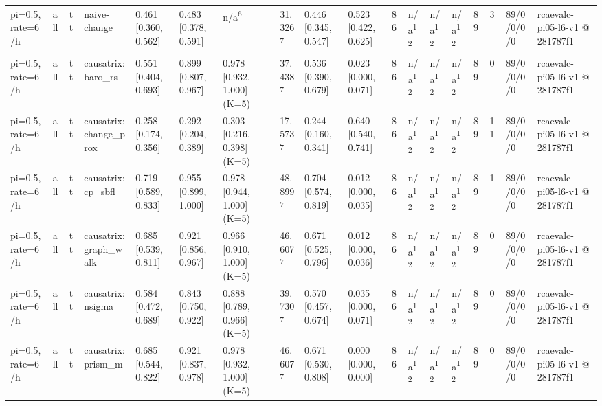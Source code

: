 \begin{table}[t]
\begin{tabular}{llllllllllllllllll}
pi=0.5, rate=6/h & all & tt & naive-change & 0.461 [0.360, 0.562] & 0.483 [0.378, 0.591] & n/a\textsuperscript{6} & 31.326\textsuperscript{7} & 0.446 [0.345, 0.547] & 0.523 [0.422, 0.625] & 86 & n/a\textsuperscript{12} & n/a\textsuperscript{12} & n/a\textsuperscript{12} & 89 & 3 & 89/0/0/0/0 & rcaevalc-pi05-l6-v1 @ 281787f1 \\
pi=0.5, rate=6/h & all & tt & causatrix:baro\_rs & 0.551 [0.404, 0.693] & 0.899 [0.807, 0.967] & 0.978 [0.932, 1.000] (K=5) & 37.438\textsuperscript{7} & 0.536 [0.390, 0.679] & 0.023 [0.000, 0.071] & 86 & n/a\textsuperscript{12} & n/a\textsuperscript{12} & n/a\textsuperscript{12} & 89 & 0 & 89/0/0/0/0 & rcaevalc-pi05-l6-v1 @ 281787f1 \\
pi=0.5, rate=6/h & all & tt & causatrix:change\_prox & 0.258 [0.174, 0.356] & 0.292 [0.204, 0.389] & 0.303 [0.216, 0.398] (K=5) & 17.573\textsuperscript{7} & 0.244 [0.160, 0.341] & 0.640 [0.540, 0.741] & 86 & n/a\textsuperscript{12} & n/a\textsuperscript{12} & n/a\textsuperscript{12} & 89 & 11 & 89/0/0/0/0 & rcaevalc-pi05-l6-v1 @ 281787f1 \\
pi=0.5, rate=6/h & all & tt & causatrix:cp\_sbfl & 0.719 [0.589, 0.833] & 0.955 [0.899, 1.000] & 0.978 [0.944, 1.000] (K=5) & 48.899\textsuperscript{7} & 0.704 [0.574, 0.819] & 0.012 [0.000, 0.035] & 86 & n/a\textsuperscript{12} & n/a\textsuperscript{12} & n/a\textsuperscript{12} & 89 & 1 & 89/0/0/0/0 & rcaevalc-pi05-l6-v1 @ 281787f1 \\
pi=0.5, rate=6/h & all & tt & causatrix:graph\_walk & 0.685 [0.539, 0.811] & 0.921 [0.856, 0.967] & 0.966 [0.910, 1.000] (K=5) & 46.607\textsuperscript{7} & 0.671 [0.525, 0.796] & 0.012 [0.000, 0.036] & 86 & n/a\textsuperscript{12} & n/a\textsuperscript{12} & n/a\textsuperscript{12} & 89 & 0 & 89/0/0/0/0 & rcaevalc-pi05-l6-v1 @ 281787f1 \\
pi=0.5, rate=6/h & all & tt & causatrix:nsigma & 0.584 [0.472, 0.689] & 0.843 [0.750, 0.922] & 0.888 [0.789, 0.966] (K=5) & 39.730\textsuperscript{7} & 0.570 [0.457, 0.674] & 0.035 [0.000, 0.071] & 86 & n/a\textsuperscript{12} & n/a\textsuperscript{12} & n/a\textsuperscript{12} & 89 & 0 & 89/0/0/0/0 & rcaevalc-pi05-l6-v1 @ 281787f1 \\
pi=0.5, rate=6/h & all & tt & causatrix:prism\_m & 0.685 [0.544, 0.822] & 0.921 [0.837, 0.978] & 0.978 [0.932, 1.000] (K=5) & 46.607\textsuperscript{7} & 0.671 [0.530, 0.808] & 0.000 [0.000, 0.000] & 86 & n/a\textsuperscript{12} & n/a\textsuperscript{12} & n/a\textsuperscript{12} & 89 & 0 & 89/0/0/0/0 & rcaevalc-pi05-l6-v1 @ 281787f1 \\

\end{tabular}
\end{table}
